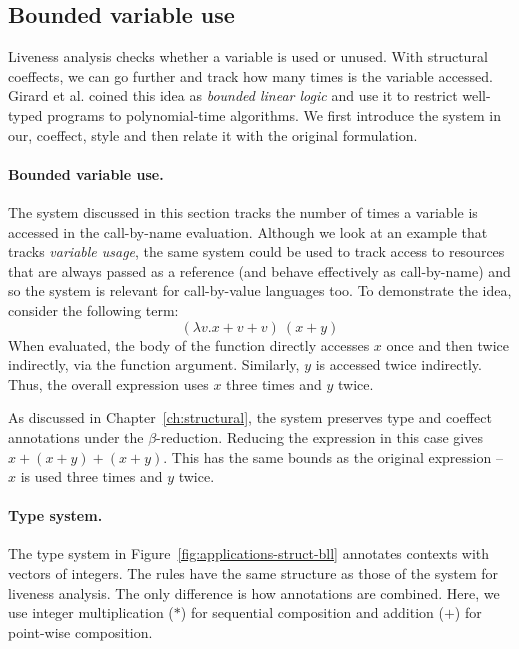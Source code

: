 
\subsection{Bounded variable use}
\label{sec:applications-struct-bll}

Liveness analysis checks whether a variable is used or unused. With structural coeffects, we can go
further and track how many times is the variable accessed. Girard et al. \cite{logic-bounded} coined
this idea as \emph{bounded linear logic} and use it to restrict well-typed programs to 
polynomial-time algorithms. We first introduce the system in our, coeffect, style and then 
relate it with the original formulation.


\paragraph{Bounded variable use.} 
The system discussed in this section tracks the number of times a variable is accessed in the 
call-by-name evaluation. Although we look at an example that tracks \emph{variable usage}, the same
system could be used to track access to resources that are always passed as a reference (and behave
effectively as call-by-name) and so the system is relevant for call-by-value languages too.
To demonstrate the idea, consider the following term:
%
\begin{equation*}
(\lambda v.x + v + v)~(x+y)
\end{equation*}
%
When evaluated, the body of the function directly accesses $x$ once and then twice indirectly, via
the function argument. Similarly, $y$ is accessed twice indirectly. Thus, the overall expression uses
$x$ three times and $y$ twice.

As discussed in Chapter~\ref{ch:structural}, the system preserves type and coeffect annotations under
the $\beta$-reduction. Reducing the expression in this case gives $x + (x+y) + (x+y)$. This has the 
same bounds as the original expression -- $x$ is used three times and $y$ twice.


\paragraph{Type system.}
The type system in Figure~\ref{fig:applications-struct-bll} annotates contexts with vectors of integers.
The rules have the same structure as those of the system for liveness analysis. The only difference is
how annotations are combined. Here, we use integer multiplication ($\ast$) for sequential composition
and addition ($+$) for point-wise composition.

